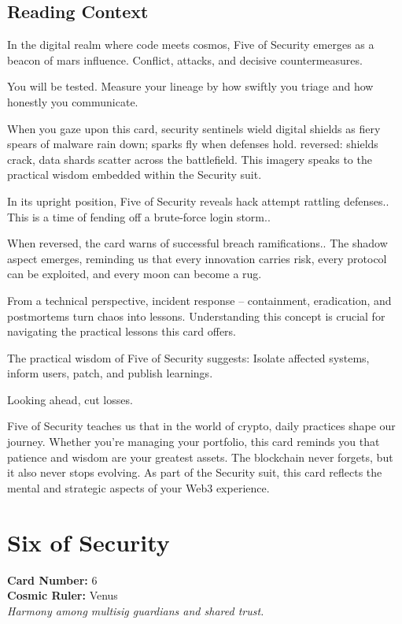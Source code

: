 \documentclass[11pt,oneside]{book}
\begin{document}
\begin{minipage}[t]{0.55\textwidth}
  \subsection*{Reading Context}
  In the digital realm where code meets cosmos, Five of Security emerges as a beacon of mars influence. Conflict, attacks, and decisive countermeasures.

  You will be tested. Measure your lineage by how swiftly you triage and how honestly you communicate.

  When you gaze upon this card, security sentinels wield digital shields as fiery spears of malware rain down; sparks fly when defenses hold. reversed: shields crack, data shards scatter across the battlefield. This imagery speaks to the practical wisdom embedded within the Security suit.

  In its upright position, Five of Security reveals hack attempt rattling defenses.. This is a time of fending off a brute-force login storm..

  When reversed, the card warns of successful breach ramifications.. The shadow aspect emerges, reminding us that every innovation carries risk, every protocol can be exploited, and every moon can become a rug.

  From a technical perspective, incident response – containment, eradication, and postmortems turn chaos into lessons. Understanding this concept is crucial for navigating the practical lessons this card offers.

  The practical wisdom of Five of Security suggests: Isolate affected systems, inform users, patch, and publish learnings.

  Looking ahead, cut losses.

  Five of Security teaches us that in the world of crypto, daily practices shape our journey. Whether you're managing your portfolio, this card reminds you that patience and wisdom are your greatest assets. The blockchain never forgets, but it also never stops evolving. As part of the Security suit, this card reflects the mental and strategic aspects of your Web3 experience.

\end{minipage}

\newpage
\section*{Six of Security}

\begin{minipage}[t]{0.55\textwidth}
  \vspace{0pt}
  \textbf{Card Number:} 6\\  \textbf{Cosmic Ruler:} Venus\\  \textit{Harmony among multisig guardians and shared trust.}
\end{minipage}
\end{document}
